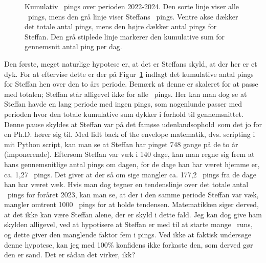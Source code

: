 \begin{article}
\begin{figure}[H]
	\centering
	\resizebox{\linewidth}{!}{}
	\vspace{-20pt}
	\caption{Kumulativ \protect\coffee\ pings over perioden 2022-2024. Den sorte linje viser alle \protect\coffee\ pings, mens den grå linje viser Steffans \protect\coffee\ pings. Ventre akse dækker det totale antal pings, mens den højre dækker antal pings for Steffan. Den grå stiplede linje markerer den kumulative sum for gennemsnit antal ping per dag.}
	\label{fig:double_cummulative_sum_vs_average_with_Steffan}
\end{figure}


Den første, meget naturlige hypotese er, at det er Steffans skyld, at der her er et dyk. For at eftervise dette er der på Figur~\ref{fig:double_cummulative_sum_vs_average_with_Steffan} indlagt det kumulative antal pings for Steffan hen over den to års periode. Bemærk at denne er skaleret for at passe med totalen; Steffan står alligevel ikke for alle \coffee\ pings.
Her kan man dog se at Steffan havde en lang periode med ingen pings, som nogenlunde passer med perioden hvor den totale kumulative sum dykker i forhold til gennemsnittet. Denne pause skyldes at Steffan var på det famøse udenlandsophold\texttrademark\ som det jo for en Ph.D. hører sig til. Med lidt back of the envelope matematik, dvs. scripting i mit Python script, kan man se at Steffan har pinget 748 gange på de to år (imponerende). Eftersom Steffan var væk i 140 dage, kan man regne sig frem at hans gennemsnitlige antal pings om dagen, for de dage han har været hjemme er, ca. 1,27 \coffee\ pings. Det giver at der så om sige mangler ca. 177,2 \coffee\ pings fra de dage han har været væk.
Hvis man dog tegner en tendenslinje over det totale antal \coffee\ pings for foråret 2023, kan man se, at der i den samme periode Steffan var væk, mangler omtrent 1000 \coffee\ pings for at holde tendensen.
Matematikken siger derved, at det ikke kan være Steffan alene, der er skyld i dette fald. Jeg kan dog give ham skylden alligevel, ved at hypotisere at Steffan er med til at starte mange \coffee\ runs, og dette giver den manglende faktor fem i pings. Ved ikke at faktisk undersøge denne hypotese, kan jeg med 100\% konfidens ikke forkaste den, som derved gør den er sand. Det er sådan det virker, ikk?


\end{article}
